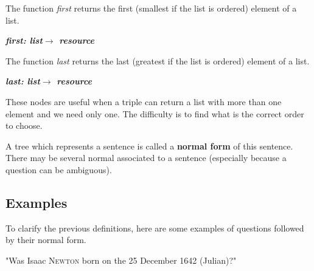 The function \textsl{first} returns the first (smallest if the list is ordered) element of a list.

\begin{center}
\textsl{\bf first: list$\rightarrow$ resource}
\end{center}

The function \textsl{last} returns the last (greatest if the list is ordered) element of a list.

\begin{center}
\textsl{\bf last: list$\rightarrow$ resource}
\end{center}

These nodes are useful when a triple can return a list with more than one element and we need only one. The difficulty is to find what is the correct order to choose.

\bigskip

A tree which represents a sentence is called a {\bf normal form} of this sentence. There may be several normal associated to a sentence (especially because a question can be ambiguous). %

\subsection{Examples}

To clarify the previous definitions, here are some examples of questions followed by their normal form.

\FloatBarrier
\bigskip

"Was Isaac \textsc{Newton} born on the 25 December 1642 (Julian)?"

\begin{figure}[!ht]
    \centering
\end{figure}

